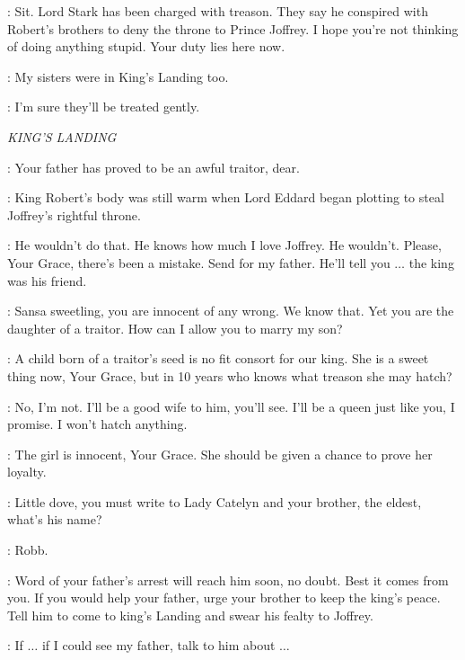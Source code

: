 \JEOR: Sit. Lord Stark has been charged with treason. They say he conspired with Robert's brothers to deny the throne to Prince Joffrey.  I hope you're not thinking of doing anything stupid. Your duty lies here now. 

\JON: My sisters were in King's Landing too. 

\JEOR: I'm sure they'll be treated gently. 


\scene

\textit{KING'S LANDING} 


\VARYS: Your father has proved to be an awful traitor, dear.

\PYCELLE: King Robert's body was still warm when Lord Eddard began plotting to steal Joffrey's rightful throne. 

\SANSA: He wouldn't do that. He knows how much I love Joffrey. He wouldn't. Please, Your Grace, there's been a mistake. Send for my father. He'll tell you $\ldots$ the king was his friend. 

\CERSEI: Sansa sweetling, you are innocent of any wrong. We know that. Yet you are the daughter of a traitor. How can I allow you to marry my son? 

\PYCELLE: A child born of a traitor's seed is no fit consort for our king. She is a sweet thing now, Your Grace, but in 10 years who knows what treason she may hatch? 

\SANSA: No, I'm not. I'll be a good wife to him, you'll see. I'll be a queen just like you, I promise. I won't hatch anything. 

\LITTLEFINGER: The girl is innocent, Your Grace. She should be given a chance to prove her loyalty. 

\CERSEI: Little dove, you must write to Lady Catelyn and your brother, the eldest, what's his name?


\SANSA: Robb. 

\CERSEI: Word of your father's arrest will reach him soon, no doubt. Best it comes from you. If you would help your father, urge your brother to keep the king's peace.  Tell him to come to king's Landing and swear his fealty to Joffrey. 

\SANSA: If $\ldots$ if I could see my father, talk to him about $\ldots$  

